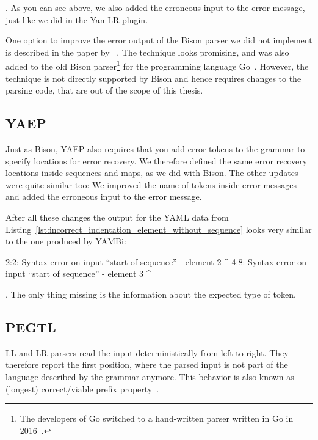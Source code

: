 . As you can see above, we also added the erroneous input to the error message, just like we did in the Yan LR plugin.

One option to improve the error output of the Bison parser we did not implement is described in the paper  by \citeauthor{jeffery2003generating}~\cite{jeffery2003generating}. The technique looks promising, and was also added to the old Bison parser\footnote{The developers of Go switched to a hand-written parser written in Go in 2016~\cite{pike2017reddit, go2016release}.} for the programming language Go~\cite{cox2010errors}. However, the technique is not directly supported by Bison and hence requires changes to the parsing code, that are out of the scope of this thesis.

\subsection{YAEP}

Just as Bison, YAEP also requires that you add error tokens to the grammar to specify locations for error recovery. We therefore defined the same error recovery locations inside sequences and maps, as we did with Bison. The other updates were quite similar too: We improved the name of tokens inside error messages and added the erroneous input to the error message.

After all these changes the output for the YAML data from Listing~\ref{lst:incorrect_indentation_element_without_sequence} looks very similar to the one produced by YAMBi:

\begin{textcode}
2:2: Syntax error on input “start of sequence”
      - element 2
      ^
4:8: Syntax error on input “start of sequence”
            - element 3
            ^
\end{textcode}

. The only thing missing is the information about the expected type of token.

\subsection{PEGTL}

LL and LR parsers read the input deterministically from left to right. They therefore report the first position, where the parsed input is not part of the language described by the grammar anymore. This behavior is also known as (longest) correct/viable prefix property~\cite{sippu1990parsing, ruefenacht2016error, maidl2016129}.

